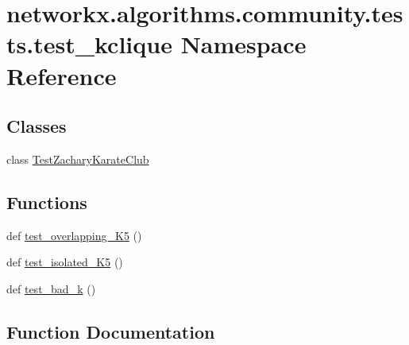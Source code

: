 \hypertarget{namespacenetworkx_1_1algorithms_1_1community_1_1tests_1_1test__kclique}{}\section{networkx.\+algorithms.\+community.\+tests.\+test\+\_\+kclique Namespace Reference}
\label{namespacenetworkx_1_1algorithms_1_1community_1_1tests_1_1test__kclique}
\subsection*{Classes}
\begin{DoxyCompactItemize}
\item 
class \hyperlink{classnetworkx_1_1algorithms_1_1community_1_1tests_1_1test__kclique_1_1TestZacharyKarateClub}{Test\+Zachary\+Karate\+Club}
\end{DoxyCompactItemize}
\subsection*{Functions}
\begin{DoxyCompactItemize}
\item 
def \hyperlink{namespacenetworkx_1_1algorithms_1_1community_1_1tests_1_1test__kclique_ae7efa8a0a93a3946edd4a445b71a8ce4}{test\+\_\+overlapping\+\_\+\+K5} ()
\item 
def \hyperlink{namespacenetworkx_1_1algorithms_1_1community_1_1tests_1_1test__kclique_ad08c9ea66f1e8bb1bb0b433a0b6ebae2}{test\+\_\+isolated\+\_\+\+K5} ()
\item 
def \hyperlink{namespacenetworkx_1_1algorithms_1_1community_1_1tests_1_1test__kclique_a64f24429e88cf5f028480e213aaf1dca}{test\+\_\+bad\+\_\+k} ()
\end{DoxyCompactItemize}


\subsection{Function Documentation}
\mbox{\label{namespacenetworkx_1_1algorithms_1_1community_1_1tests_1_1test__kclique_a64f24429e88cf5f028480e213aaf1dca}} 
